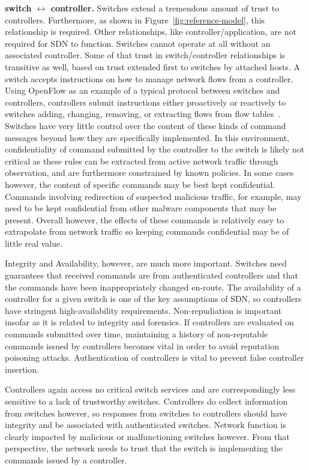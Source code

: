 \documentclass[10pt,conference]{IEEEtran}
\begin{document}
\noindent
{\bf switch $\leftrightarrow$ controller.}
Switches extend a tremendous amount of trust to controllers.  Furthermore, as shown in Figure~\ref{fig:reference-model}, this relationship is required.  Other relationships, like controller/application, are not required for SDN to function. Switches cannot operate at all without an associated controller.  Some of that trust in switch/controller relationships is transitive as well, based on trust extended first to switches by attached hosts.  A switch accepts instructions on how to manage network flows from a controller.  Using OpenFlow as an example of a typical protocol between switches and controllers, controllers submit instructions either proactively or reactively to switches adding, changing, removing, or extracting flows from flow tables~\cite{openflow1.4}.  Switches have very little control over the content of these kinds of command messages beyond how they are specifically implemented.  In this environment, confidentiality of command submitted by the controller to the switch is likely not critical as these rules can be extracted from active network traffic through observation, and are furthermore constrained by known policies.  In some cases however, the content of specific commands may be best kept confidential.  Commands involving redirection of suspected malicious traffic, for example, may need to be kept confidential from other malware components that may be present.  Overall however, the effects of these commands is relatively easy to extrapolate from network traffic so keeping commands confidential may be of little real value.

Integrity and Availability, however, are much more important.  Switches need guarantees that received commands are from authenticated controllers and that the commands have been inappropriately changed en-route.  The availability of a controller for a given switch is one of the key assumptions of SDN, so controllers have stringent high-availability requirements.  Non-repudiation is important insofar as it is related to integrity and forensics.  If controllers are evaluated on commands submitted over time, maintaining a history of non-reputable commands issued by controllers becomes vital in order to avoid reputation poisoning attacks.  Authentication of controllers is vital to prevent false controller insertion.

Controllers again access no critical switch services and are correspondingly less sensitive to a lack of trustworthy switches.  Controllers do collect information from switches however, so responses from switches to controllers should have integrity and be associated with authenticated switches.  Network function is clearly impacted by malicious or malfunctioning switches however.  From that perspective, the network needs to trust that the switch is implementing the commands issued by a controller.
\end{document}
